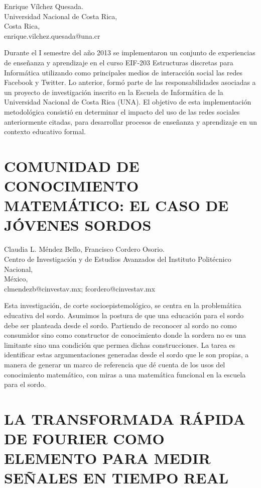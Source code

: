 \begin{datos}
Enrique Vílchez Quesada. \\
Universidad Nacional de Costa Rica,\\
Costa Rica,\\
\hfill  enrique.vilchez.quesada@una.cr  
\end{datos}

Durante el I semestre del año 2013 se implementaron un conjunto de
experiencias de enseñanza y aprendizaje en el curso EIF-203 Estructuras
discretas para Informática utilizando como principales medios de interacción
social las redes Facebook y Twitter. Lo anterior, formó parte de las
responsabilidades asociadas a un proyecto de investigación inscrito
en la Escuela de Informática de la Universidad Nacional de Costa Rica
(UNA). El objetivo de esta implementación metodológica consistió en
determinar el impacto del uso de las redes sociales anteriormente
citadas, para desarrollar procesos de enseñanza y aprendizaje en un
contexto educativo formal. 


\section{COMUNIDAD DE CONOCIMIENTO MATEMÁTICO: EL CASO DE JÓVENES SORDOS }

\begin{datos}
Claudia L. Méndez Bello, Francisco Cordero Osorio.\\
Centro de Investigación y de Estudios Avanzados del Instituto Politécnico Nacional,\\
México,\\
\hfill  clmendezb@cinvestav.mx; fcordero@cinvestav.mx  
\end{datos}

Esta investigación, de corte socioepistemológico, se centra en la
problemática educativa del sordo. Asumimos la postura de que una educación
para el sordo debe ser planteada desde el sordo. Partiendo de reconocer
al sordo no como consumidor sino como constructor de conocimiento
donde la sordera no es una limitante sino una condición que permea
dichas construcciones. La tarea es identificar estas argumentaciones
generadas desde el sordo que le son propias, a manera de generar un
marco de referencia que dé cuenta de los usos del conocimiento matemático,
con miras a una matemática funcional en la escuela para el sordo.


\section{LA TRANSFORMADA RÁPIDA DE FOURIER COMO ELEMENTO PARA MEDIR SEÑALES
EN TIEMPO REAL}

